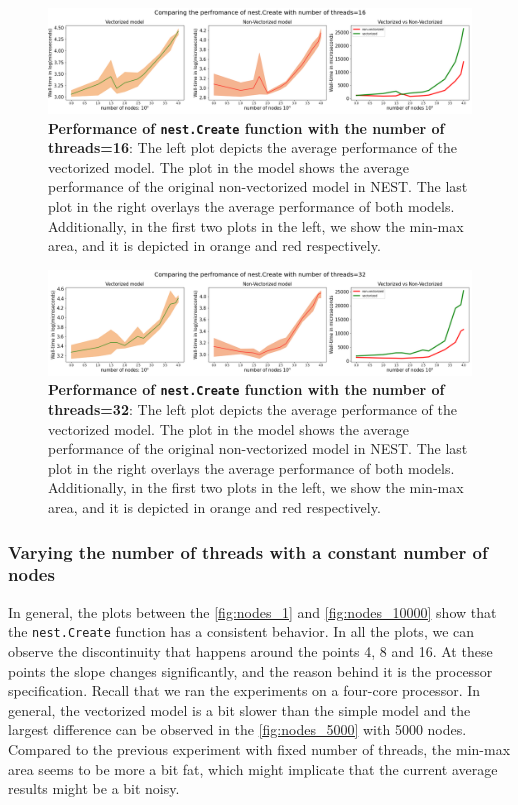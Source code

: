 \begin{figure}[ht!]
    \centering
    \includegraphics[width=\textwidth]{src/pic/thread_16.png}
    \caption{\textbf{Performance of \texttt{nest.Create} function with the number of threads=16}: The left plot depicts the average performance of the vectorized model. The plot in the model shows the average performance of the original non-vectorized model in NEST. The last plot in the right overlays the average performance of both models. Additionally, in the first two plots in the left, we show the min-max area, and it is depicted in orange and red respectively.}
    \label{fig:threads_16}
\end{figure}

\begin{figure}[ht!]
    \centering
    \includegraphics[width=\textwidth]{src/pic/thread_32.png}
    \caption{\textbf{Performance of \texttt{nest.Create} function with the number of threads=32}: The left plot depicts the average performance of the vectorized model. The plot in the model shows the average performance of the original non-vectorized model in NEST. The last plot in the right overlays the average performance of both models. Additionally, in the first two plots in the left, we show the min-max area, and it is depicted in orange and red respectively.}
    \label{fig:threads_32}
\end{figure}

\subsubsection*{Varying the number of threads with a constant number of nodes}


In general, the plots between the \autoref{fig:nodes_1} and \autoref{fig:nodes_10000} show that the \texttt{nest.Create} function has a consistent behavior. In all the plots, we can observe the discontinuity that happens around the points 4, 8 and 16. At these points the slope changes significantly, and the reason behind it is the processor specification. Recall that we ran the experiments on a four-core processor. In general, the vectorized model is a bit slower than the simple model and the largest difference can be observed in the \autoref{fig:nodes_5000} with 5000 nodes. Compared to the previous experiment with fixed number of threads, the min-max area seems to be more a bit fat, which might implicate that the current average results might be a bit noisy.

